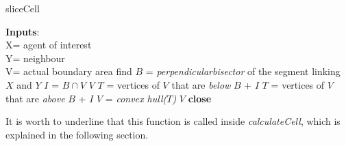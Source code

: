 \documentclass[a4paper,11pt,oneside]{book}
\begin{document}
\begin{algorithm}[H]
\caption{sliceCell}\label{euclid}
\begin{algorithmic}[1]
\State	\textbf{Inputs}:\\
			\hspace{\algorithmicindent}X= agent of interest\\
			 \hspace{\algorithmicindent}Y= neighbour\\
			 \hspace{\algorithmicindent}V= actual boundary area
\State find $\mathit{B}$ = \emph{perpendicularbisector} of the segment linking $\mathit{X}$ and $\mathit{Y}$
\State $\mathit{I}$ = $\mathit{B}  \cap  \mathit{V}$ 
\State \Return $V$
\Else
	\State $\mathit{T}$ = vertices of $\mathit{V}$ that are \emph{below} $\mathit{B}$ + $\mathit{I}$
	\Else
	\State $\mathit{T}$ = vertices of $\mathit{V}$ that are \emph{above} $\mathit{B}$ + $\mathit{I}$
	\EndIf
	\State $\mathit{V}$ = \emph{convex hull($\mathit{T}$)}
	\State \Return $\mathit{V}$
\EndIf
\State \textbf{close}
\end{algorithmic}
\end{algorithm}	

It is worth to underline that this function is called inside \textit{calculateCell}, which is explained in the following section.
\end{document}
